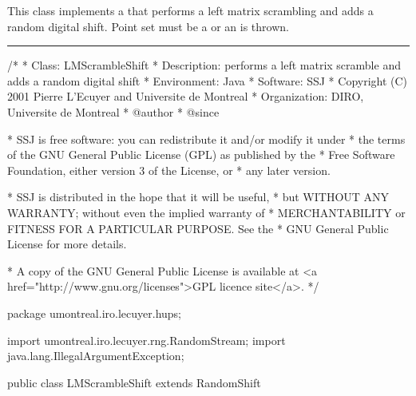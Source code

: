 
This class implements a
that performs a left matrix scrambling and adds a random digital
shift. Point set must be a
 or an
 is thrown.

\bigskip\hrule\bigskip

\begin{code}
\begin{hide}
/*
 * Class:        LMScrambleShift
 * Description:  performs a left matrix scramble and adds a random digital shift
 * Environment:  Java
 * Software:     SSJ 
 * Copyright (C) 2001  Pierre L'Ecuyer and Universite de Montreal
 * Organization: DIRO, Universite de Montreal
 * @author       
 * @since

 * SSJ is free software: you can redistribute it and/or modify it under
 * the terms of the GNU General Public License (GPL) as published by the
 * Free Software Foundation, either version 3 of the License, or
 * any later version.

 * SSJ is distributed in the hope that it will be useful,
 * but WITHOUT ANY WARRANTY; without even the implied warranty of
 * MERCHANTABILITY or FITNESS FOR A PARTICULAR PURPOSE.  See the
 * GNU General Public License for more details.

 * A copy of the GNU General Public License is available at
   <a href="http://www.gnu.org/licenses">GPL licence site</a>.
 */
\end{hide}
package umontreal.iro.lecuyer.hups;
\begin{hide}
 import umontreal.iro.lecuyer.rng.RandomStream;
 import java.lang.IllegalArgumentException;
\end{hide}

public class LMScrambleShift extends RandomShift \begin{hide} {
\end{hide}
\end{code}

